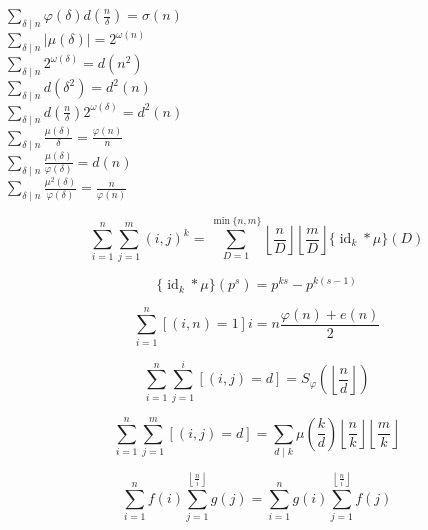 \begin{multicols}{3}
    \(\displaystyle \sum_{\delta\mid n}\varphi(\delta)d\left(\frac{n}{\delta}\right) = \sigma(n)\) \\
    \(\displaystyle \sum_{\delta\mid n}\left|\mu(\delta)\right| = 2^{\omega(n)}\) \\
    \(\displaystyle \sum_{\delta\mid n}2^{\omega(\delta)} = d(n^2)\) \\
    \(\displaystyle \sum_{\delta\mid n}d(\delta^2) = d^2(n)\) \\
    \(\displaystyle \sum_{\delta\mid n}d\left(\frac{n}{\delta}\right)2^{\omega(\delta)} = d^2(n)\) \\
    \(\displaystyle \sum_{\delta\mid n}\frac{\mu(\delta)}{\delta} = \frac{\varphi(n)}{n}\) \\
    \(\displaystyle \sum_{\delta\mid n}\frac{\mu(\delta)}{\varphi(\delta)} = d(n)\) \\
    \(\displaystyle \sum_{\delta\mid n}\frac{\mu^2(\delta)}{\varphi(\delta)} = \frac{n}{\varphi(n)}\)
\end{multicols}

\begin{equation}
    \sum_{i=1}^n\sum_{j=1}^m(i,j)^k=\sum_{D=1}^{\min\{n,m\}}\left\lfloor\frac{n}{D}\right\rfloor\left\lfloor\frac{m}{D}\right\rfloor\{\operatorname{id}_k*\mu\}(D)
\end{equation}

\begin{equation}
    \{\operatorname{id}_k*\mu\}(p^s)=p^{ks}-p^{k(s-1)}
\end{equation}

\begin{equation}
    \sum_{i = 1} ^ n \left[(i, n) = 1\right] i = n \frac {\varphi(n) + e(n)} 2
\end{equation}

\begin{equation}
    \sum_{i = 1} ^ n \sum_{j = 1} ^ i \left[(i, j) = d\right] = S_\varphi \left( \left\lfloor \frac n d \right\rfloor \right)
\end{equation}

\begin{equation}
    \sum_{i = 1} ^ n \sum_{j = 1} ^ m \left[(i, j) = d\right] = \sum_{d \mid  k} \mu\left( \frac k d \right) \left\lfloor \frac n k \right\rfloor \left\lfloor \frac m k \right\rfloor
\end{equation}

\begin{equation}
    \sum_{i = 1} ^ n f(i) \sum_{j = 1} ^ {\left\lfloor \frac n i \right\rfloor} g(j) = \sum_{i = 1} ^ n g(i) \sum_{j = 1} ^ {\left\lfloor \frac n i \right\rfloor} f(j)
\end{equation}

